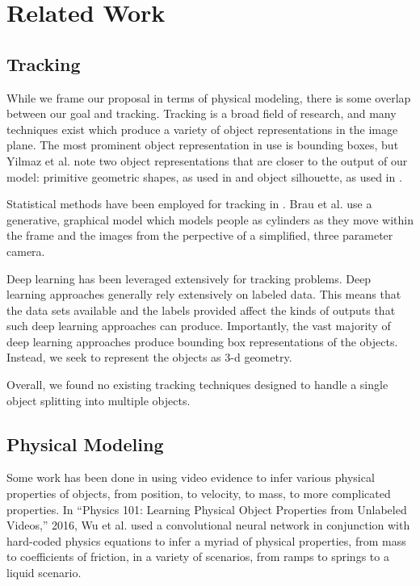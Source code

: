 \documentclass[10pt,twocolumn,letterpaper]{article}
\begin{document}
\section{Related Work}

\subsection{Tracking}

While we frame our proposal in terms of physical modeling, there is some overlap 
between our goal and tracking. Tracking is a broad field of research, and many 
techniques exist which produce a variety of object representations in the image 
plane. The most prominent object representation in use is bounding boxes, but Yilmaz 
et al.\cite{Yilmaz:2006:OTS:1177352.1177355} note two object representations that are closer to the 
output of our model: primitive geometric shapes, as used in \cite{Comaniciu2003} and object silhouette, 
as used in \cite{YILMAZ2003623}.


Statistical methods have been employed for tracking in \cite{4767755} \cite{BarShalom1990} \cite{317728} \cite{Brau_2013_ICCV}.
Brau et al.\cite{Brau_2013_ICCV} use a generative, graphical model which models people as cylinders 
as they move within the frame and the images from the perpective of a 
simplified, three parameter camera.

Deep learning has been leveraged extensively for tracking problems.\cite{LI2018323} 
Deep learning approaches generally rely extensively on labeled data. This means that the data sets 
available and the labels provided affect the kinds of outputs that such deep 
learning approaches can produce. Importantly, the vast majority of deep learning 
approaches produce bounding box representations of the objects. Instead, we seek 
to represent the objects as 3-d geometry.

Overall, we found no existing tracking techniques designed to handle a single 
object splitting into multiple objects.

\subsection{Physical Modeling}

Some work has been done in using video evidence to infer various physical 
properties of objects, from position, to velocity, to mass, to more complicated 
properties. In “Physics 101: Learning Physical Object Properties from Unlabeled 
Videos,” 2016, Wu et al. used a convolutional neural network in conjunction with 
hard-coded physics equations to infer a myriad of physical properties, from mass 
to coefficients of friction, in a variety of scenarios, from ramps to springs to 
a liquid scenario.
\end{document}
